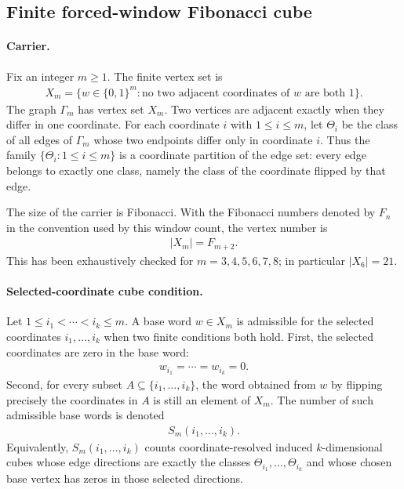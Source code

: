 
\subsection{Finite forced-window Fibonacci cube}
\label{sec:window-fibonacci-cube-theta-cube-decomposition}

\paragraph{Carrier.}
Fix an integer $m \ge 1$. The finite vertex set is
$$
\begin{aligned}
X_m=\{w \in \{0,1\}^m : \text{no two adjacent coordinates of } w \text{ are both } 1\}.
\end{aligned}
$$
The graph $\Gamma_m$ has vertex set $X_m$. Two vertices are adjacent exactly when they differ in one coordinate. For each coordinate $i$ with $1 \le i \le m$, let $\Theta_i$ be the class of all edges of $\Gamma_m$ whose two endpoints differ only in coordinate $i$. Thus the family $\{\Theta_i : 1 \le i \le m\}$ is a coordinate partition of the edge set: every edge belongs to exactly one class, namely the class of the coordinate flipped by that edge.

The size of the carrier is Fibonacci. With the Fibonacci numbers denoted by $F_n$ in the convention used by this window count, the vertex number is
$$
\begin{aligned}
|X_m|=F_{m+2}.
\end{aligned}
$$
This has been exhaustively checked for $m=3,4,5,6,7,8$; in particular $|X_6|=21$.

\paragraph{Selected-coordinate cube condition.}
Let $1 \le i_1 < \cdots < i_k \le m$. A base word $w \in X_m$ is admissible for the selected coordinates $i_1,\ldots,i_k$ when two finite conditions both hold. First, the selected coordinates are zero in the base word:
$$
\begin{aligned}
w_{i_1}=\cdots=w_{i_k}=0.
\end{aligned}
$$
Second, for every subset $A \subseteq \{i_1,\ldots,i_k\}$, the word obtained from $w$ by flipping precisely the coordinates in $A$ is still an element of $X_m$. The number of such admissible base words is denoted
$$
\begin{aligned}
S_m(i_1,\ldots,i_k).
\end{aligned}
$$
Equivalently, $S_m(i_1,\ldots,i_k)$ counts coordinate-resolved induced $k$-dimensional cubes whose edge directions are exactly the classes $\Theta_{i_1},\ldots,\Theta_{i_k}$ and whose chosen base vertex has zeros in those selected directions.


